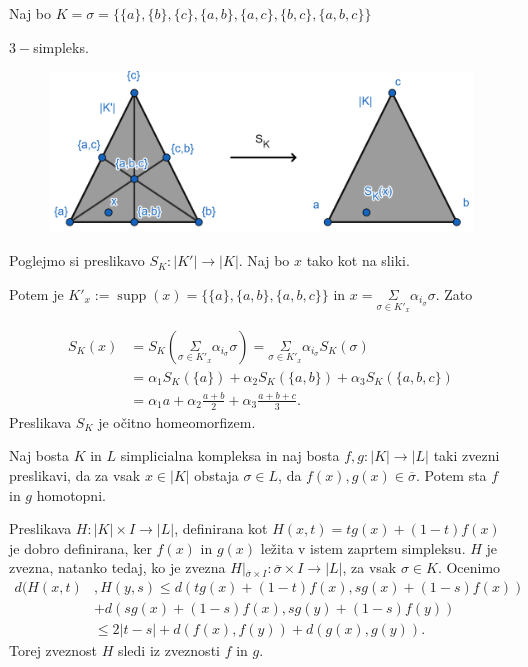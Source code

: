 \documentclass[mat1]{fmfdelo}
\DeclareMathOperator*{\supp}{supp}
\begin{document}
 \begin{primer}
 Naj bo $K=\sigma=\{\{a\},\{b\},\{c\},\{a,b\},\{a,c\},\{b,c\},\{a,b,c\}\}$ 
 
 $3-$simpleks.
 \begin{figure}[h]
     \centering
     \includegraphics[width=0.7\linewidth]{sk.png}
 \end{figure}
 Poglejmo si preslikavo $S_K: |K'| \rightarrow |K|$. Naj bo $x$ tako kot na sliki. %
 
 Potem je 
 $K'_x:=\supp(x)=\{\{a\},\{a,b\},\{a,b,c\}\}$ in $x= \underset{\sigma\in K'_x}{\Sigma} \alpha_{i_\sigma} \sigma$. Zato
 
 \begin{align*}
 S_K(x)&=S_K(\underset{\sigma\in K'_x}{\Sigma} \alpha_{i_{\sigma}} 
  \sigma) =  \underset{\sigma\in K'_x}{\Sigma} \alpha_{i_{\sigma}} 
 S_K(\sigma)\\
 &=\alpha_1S_K(\{a\})+\alpha_2S_K(\{a,b\})+\alpha_3S_K(\{a,b,c\}) \\ 
 &=\alpha_1a+\alpha_2\frac{a+b}{2}+\alpha_3\frac{a+b+c}{3}.
 \end{align*}
 Preslikava $S_K$ je očitno homeomorfizem.
 
 
 
 \end{primer}


 \begin{trditev}
    Naj bosta $K$ in $L$ simplicialna kompleksa in naj bosta $f,g:|K|\rightarrow |L|$ taki zvezni preslikavi, da za vsak $x\in |K|$ obstaja $\sigma \in L$, da $f(x),g(x) \in \overline{\sigma}.$ Potem sta $f$ in $g$ homotopni.
    \label{tr:shom}
\end{trditev}

\begin{dokaz}
    Preslikava $H:|K|\times I\rightarrow |L|$, definirana kot $H(x,t)=tg(x) + (1-t)f(x)$ je dobro definirana, ker $f(x)$ in $g(x)$ ležita v istem zaprtem simpleksu. $H$ je zvezna, natanko tedaj, ko je zvezna $H|_{\overline{\sigma}\times I}:\overline{\sigma}\times I \rightarrow |L|$, za vsak $\sigma \in K$. Ocenimo 
\begin{align*}
    d(H(x,t)&,H(y,s)\leq d(tg(x)+(1-t)f(x),sg(x)+(1-s)f(x)) \\
&+d(sg(x)+(1-s)f(x),sg(y)+(1-s)f(y))\\
&\leq 2|t-s|+d(f(x),f(y))+d(g(x),g(y)).
\end{align*}
Torej zveznost $H$ sledi iz zveznosti $f$ in $g$.
\end{dokaz}
\end{document}
